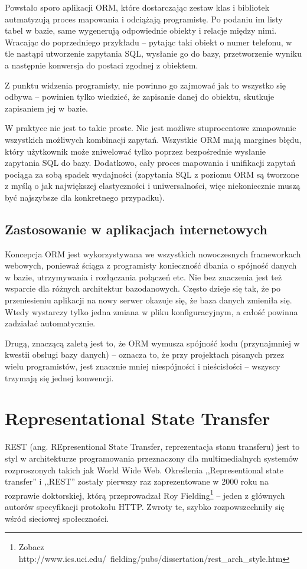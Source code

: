 \documentclass[a4paper,12pt,oneside]{report}
\begin{document}
Powstało sporo aplikacji ORM, które dostarczając zestaw klas i bibliotek autmatyzują proces mapowania i odciążają programistę. Po podaniu im listy tabel w bazie, same wygenerują odpowiednie obiekty i relacje między nimi. Wracając do poprzedniego przykładu -- pytając taki obiekt o numer telefonu, w tle nastąpi utworzenie zapytania SQL, wysłanie go do bazy, przetworzenie wyniku a następnie konwersja do postaci zgodnej z obiektem.

Z punktu widzenia programisty, nie powinno go zajmować jak to wszystko się odbywa -- powinien tylko wiedzieć, że zapisanie danej do obiektu, skutkuje zapisaniem jej w bazie.

W praktyce nie jest to takie proste. Nie jest możliwe stuprocentowe zmapowanie wszystkich możliwych kombinacji zapytań. Wszystkie ORM mają margines błędu, który użytkownik może zniwelować tylko poprzez bezpośrednie wysłanie zapytania SQL do bazy. Dodatkowo, cały proces mapowania i unifikacji zapytań pociąga za sobą spadek wydajności (zapytania SQL z poziomu ORM są tworzone z myślą o jak największej elastyczności i uniwersalności, więc niekoniecznie muszą być najszybsze dla konkretnego przypadku).

\subsection{Zastosowanie w aplikacjach internetowych}
\label{subsec:orm-web}
Koncepcja ORM jest wykorzystywana we wszystkich nowoczesnych frameworkach webowych, ponieważ ściąga z programisty konieczność dbania o spójność danych w bazie, utrzymywania i rozłączania połączeń etc. Nie bez znaczenia jest też wsparcie dla różnych architektur bazodanowych. Często dzieje się tak, że po przeniesieniu aplikacji na nowy serwer okazuje się, że baza danych zmieniła się. Wtedy wystarczy tylko jedna zmiana w pliku konfiguracyjnym, a całość powinna zadziałać automatycznie.

Drugą, znaczącą zaletą jest to, że ORM wymusza spójność kodu (przynajmniej w kwestii obsługi bazy danych) -- oznacza to, że przy projektach pisanych przez wielu programistów, jest znacznie mniej niespójności i nieścisłości -- wszyscy trzymają się jednej konwencji.

\section{Representational State Transfer}
\label{sec:rest}
REST (ang. REpresentional State Transfer, reprezentacja stanu transferu) jest to styl w architekturze programowania przeznaczony dla multimedialnych systemów rozproszonych takich jak World Wide Web. Określenia ,,Representional state transfer'' i ,,REST'' zostały pierwszy raz zaprezentowane w 2000 roku na rozprawie doktorskiej, którą przeprowadzał Roy Fielding\footnote{Zobacz http://www.ics.uci.edu/~fielding/pubs/dissertation/rest\_arch\_style.htm} -- jeden z głównych autorów specyfikacji protokołu HTTP. Zwroty te, szybko rozpowszechniły się wśród sieciowej społeczności.
\end{document}

